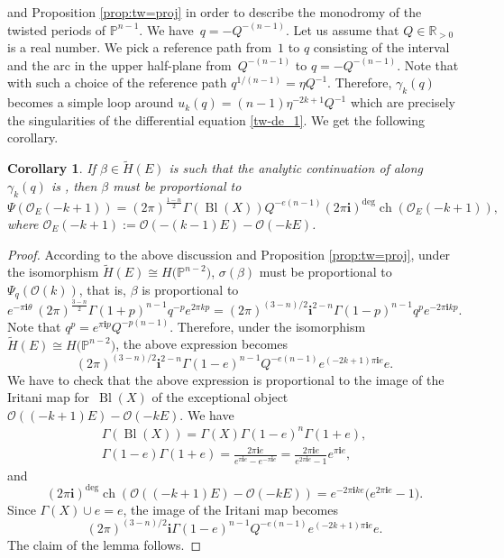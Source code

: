 \documentclass[pdftex]{sigma}
\numberwithin{equation}{section}
\newtheorem{Corollary}[Theorem]{Corollary}
\newcommand{\leftexp}[2]{{\vphantom{#2}}^{#1}{#2}}
\newcommand{\PP}{\mathbb{P}}
\newcommand{\RR}{\mathbb{R}}
\newcommand{\ii}{\mathbf{i}}
\renewcommand{\O}{\mathcal{O}}
\begin{document}
and Proposition \ref{prop:tw=proj} in order to describe the monodromy
of the twisted periods of $\PP^{n-1}$. We have~${q=-Q^{-(n-1)}}$. Let us
assume that $Q\in \RR_{>0}$ is a real number. We pick a reference path
from~$1$ to $q$ consisting of the interval \smash{$\big[1,Q^{-(n-1)}\big]$} and the arc in
the upper half-plane from~${Q^{-(n-1)}}$ to $q = - Q^{-(n-1)}.$
Note that with such a choice of the reference path $q^{1/(n-1)}=\eta Q^{-1}$. Therefore, $\gamma_k(q)$ becomes a simple loop around $u_k(q)=(n-1)
\eta^{-2k+1} Q^{-1}$ which are precisely the singularities of the
differential equation \eqref{tw-de_1}. We get the following corollary.
\begin{Corollary}\label{cor:tw_refl}
If $\beta\in \widetilde{H}(E)$ is such that the analytic continuation
of \smash{$\leftexp{tw}{I}^{(-m)}_\beta(Q,\lambda)$} along $\gamma_k(q)$ is
\smash{$\leftexp{tw}{I}^{(-m)}_{-\beta}(Q,\lambda)$}, then $\beta$ must be
proportional to
\[
\Psi(\O_E(-k+1)) = (2\pi)^{\frac{1-n}{2}}
\Gamma(\operatorname{Bl}(X)) Q^{-e(n-1)}
(2\pi\ii)^{\operatorname{deg}}
\operatorname{ch}(\O_E(-k+1)),
\]
where $\O_E(-k+1):=\O(-(k-1) E)-\O(-kE)$.
\end{Corollary}

\begin{proof}
According to the above discussion and Proposition \ref{prop:tw=proj},
under the isomorphism $\widetilde{H}(E)\cong H\big(\PP^{n-2}\big)$,
$\sigma(\beta)$ must be proportional to $\Psi_q(\O(k))$, that is,
$\beta$ is proportional to
\[
e^{-\pi\ii \theta} \
(2\pi)^{\frac{3-n}{2}} \Gamma(1+p)^{n-1} q^{-p} e^{2\pi k p}=
(2\pi)^{(3-n)/2} \ii^{2-n}
\Gamma(1-p)^{n-1} q^p e^{-2\pi\ii k p}.
\]
Note that $q^p = e^{\pi\ii p} Q^{-p(n-1)}$. Therefore, under the
isomorphism $\widetilde{H}(E)\cong H\big(\PP^{n-2}\big)$, the above
expression becomes
\[
(2\pi)^{(3-n)/2} \ii^{2-n}
\Gamma(1-e)^{n-1} Q^{-e(n-1)} e^{(-2k+1)\pi\ii e} e.
\]
We have to check that the above expression is proportional to the
image of the Iritani map for~$\operatorname{Bl}(X)$ of the exceptional object
$\O((-k+1)E)-\O(-kE).$ We have
\begin{gather*}
\Gamma(\operatorname{Bl}(X))= \Gamma(X) \Gamma(1-e)^n \Gamma(1+e),\\
\Gamma(1-e)\Gamma(1+e) = \frac{2\pi\ii e}{e^{\pi\ii e}-e^{-\pi\ii
 e}} =
\frac{2\pi\ii e}{e^{2\pi\ii e}-1} e^{\pi\ii e},
\end{gather*}
and
\[
(2\pi\ii)^{\operatorname{deg}}
\operatorname{ch}(\O((-k+1)E)-\O(-kE))=
e^{-2\pi\ii k e }\big(e^{2\pi\ii e}-1\big).
\]
Since $\Gamma(X)\cup e= e$, the image of the Iritani map becomes
\[
(2\pi)^{(3-n)/2} \ii \Gamma(1-e)^{n-1} Q^{-e(n-1)}
e^{(-2k+1)\pi\ii e} e.
\]
The claim of the lemma follows.
\end{proof}
\end{document}
